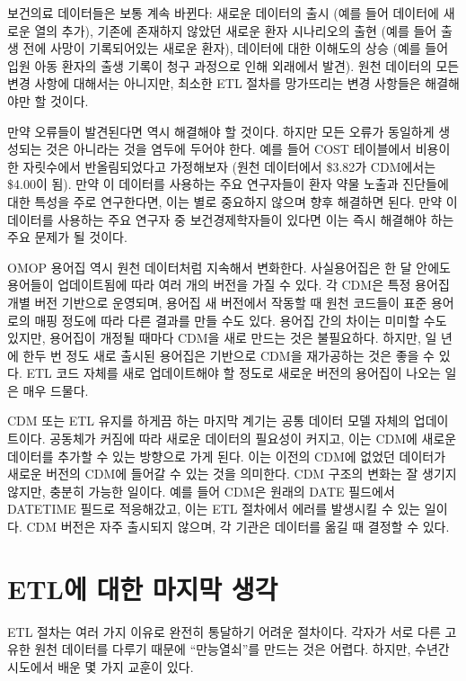 \documentclass[11pt]{book}
\theoremstyle{definition}
\theoremstyle{definition}
\theoremstyle{definition}
\theoremstyle{remark}
\begin{document}
보건의료 데이터들은 보통 계속 바뀐다: 새로운 데이터의 출시 (예를 들어
데이터에 새로운 열의 추가), 기존에 존재하지 않았던 새로운 환자
시나리오의 출현 (예를 들어 출생 전에 사망이 기록되어있는 새로운 환자),
데이터에 대한 이해도의 상승 (예를 들어 입원 아동 환자의 출생 기록이 청구
과정으로 인해 외래에서 발견). 원천 데이터의 모든 변경 사항에 대해서는
아니지만, 최소한 ETL 절차를 망가뜨리는 변경 사항들은 해결해야만 할
것이다.

만약 오류들이 발견된다면 역시 해결해야 할 것이다. 하지만 모든 오류가
동일하게 생성되는 것은 아니라는 것을 염두에 두어야 한다. 예를 들어 COST
테이블에서 비용이 한 자릿수에서 반올림되었다고 가정해보자 (원천
데이터에서 \$3.82가 CDM에서는 \$4.00이 됨). 만약 이 데이터를 사용하는
주요 연구자들이 환자 약물 노출과 진단들에 대한 특성을 주로 연구한다면,
이는 별로 중요하지 않으며 향후 해결하면 된다. 만약 이 데이터를 사용하는
주요 연구자 중 보건경제학자들이 있다면 이는 즉시 해결해야 하는 주요
문제가 될 것이다.

OMOP 용어집 역시 원천 데이터처럼 지속해서 변화한다. 사실용어집은 한 달
안에도 용어들이 업데이트됨에 따라 여러 개의 버전을 가질 수 있다. 각
CDM은 특정 용어집 개별 버전 기반으로 운영되며, 용어집 새 버전에서 작동할
때 원천 코드들이 표준 용어로의 매핑 정도에 따라 다른 결과를 만들 수도
있다. 용어집 간의 차이는 미미할 수도 있지만, 용어집이 개정될 때마다
CDM을 새로 만드는 것은 불필요하다. 하지만, 일 년에 한두 번 정도 새로
출시된 용어집은 기반으로 CDM을 재가공하는 것은 좋을 수 있다. ETL 코드
자체를 새로 업데이트해야 할 정도로 새로운 버전의 용어집이 나오는 일은
매우 드물다.

CDM 또는 ETL 유지를 하게끔 하는 마지막 계기는 공통 데이터 모델 자체의
업데이트이다. 공동체가 커짐에 따라 새로운 데이터의 필요성이 커지고, 이는
CDM에 새로운 데이터를 추가할 수 있는 방향으로 가게 된다. 이는 이전의
CDM에 없었던 데이터가 새로운 버전의 CDM에 들어갈 수 있는 것을 의미한다.
CDM 구조의 변화는 잘 생기지 않지만, 충분히 가능한 일이다. 예를 들어
CDM은 원래의 DATE 필드에서 DATETIME 필드로 적응해갔고, 이는 ETL 절차에서
에러를 발생시킬 수 있는 일이다. CDM 버전은 자주 출시되지 않으며, 각
기관은 데이터를 옮길 때 결정할 수 있다.

\section{ETL에 대한 마지막 생각}\label{etl---}

ETL 절차는 여러 가지 이유로 완전히 통달하기 어려운 절차이다. 각자가 서로
다른 고유한 원천 데이터를 다루기 때문에 ``만능열쇠''를 만드는 것은
어렵다. 하지만, 수년간 시도에서 배운 몇 가지 교훈이 있다.
\end{document}
